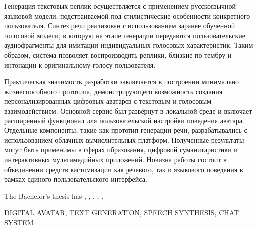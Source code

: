 Генерация текстовых реплик осуществляется с применением русскоязычной языковой модели, подстраиваемой под стилистические особенности конкретного пользователя. Синтез речи реализован с использованием заранее обученной голосовой модели, в которую на этапе генерации передаются пользовательские аудиофрагменты для имитации индивидуальных голосовых характеристик. Таким образом, система позволяет воспроизводить реплики, близкие по тембру и интонации к оригинальному голосу пользователя.

Практическая значимость разработки заключается в построении минимально жизнеспособного прототипа, демонстрирующего возможность создания персонализированных цифровых аватаров с текстовым и голосовым взаимодействием. Основной сервис был развёрнут в локальной среде и включает расширенный функционал для пользовательской настройки поведения аватара. Отдельные компоненты, такие как прототип генерации речи, разрабатывались с использованием облачных вычислительных платформ. Полученные результаты могут быть применимы в сферах образования, цифровой гуманитаристики и интерактивных мультимедийных приложений. Новизна работы состоит в объединении средств кастомизации как речевого, так и языкового поведения в рамках единого пользовательского интерфейса.



\clearpage
{}


The Bachelor's thesis has
,
,
,
, 
.
\bigskip

\noindent
DIGITAL AVATAR, TEXT GENERATION, SPEECH SYNTHESIS, CHAT SYSTEM
\bigskip

%

